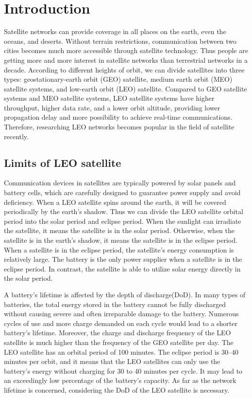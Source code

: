 \section{Introduction}
\label{ch:Introduction}
Satellite networks can provide coverage in all places on the earth, even the oceans, and deserts. Without terrain restrictions, communication between two cities becomes much more accessible through satellite technology. Thus people are getting more and more interest in satellite networks than terrestrial networks in a decade. According to different heights of orbit, we can divide satellites into three types: geostationary-earth orbit (GEO) satellite, medium earth orbit (MEO) satellite systems, and low-earth orbit (LEO) satellite. Compared to GEO satellite systems and MEO satellite systems, LEO satellite systems have higher throughput, higher data rate, and a lower orbit altitude, providing lower propagation delay and more possibility to achieve real-time communications\cite{AGENTBASED}. Therefore, researching LEO networks becomes popular in the field of satellite recently.

\subsection{Limits of LEO satellite}
Communication devices in satellites are typically powered by solar panels and battery cells, which are carefully designed to guarantee power supply and avoid deficiency\cite{CISCO}. When a LEO satellite spins around the earth, it will be covered periodically by the earth's shadow. Thus we can divide the LEO satellite orbital period into the solar period and eclipse period. When the sunlight can irradiate the satellite, it means the satellite is in the solar period. Otherwise, when the satellite is in the earth’s shadow, it means the satellite is in the eclipse period. When a satellite is in the eclipse period, the satellite’s energy consumption is relatively large. The battery is the only power supplier when a satellite is in the eclipse period. In contrast, the satellite is able to utilize solar energy directly in the solar period.

A battery's lifetime is affected by the depth of discharge(DoD). In many types of batteries, the total energy stored in the battery cannot be fully discharged without causing severe and often irreparable damage to the battery. Numerous cycles of use and more charge demanded on each cycle would lead to a shorter battery's lifetime. Moreover, the charge and discharge frequency of the LEO satellite is much higher than the frequency of the GEO satellite per day. The LEO satellite has an orbital period of 100 minutes. The eclipse period is 30–40 minutes per orbit, and it means that the LEO satellites can only use the battery's energy without charging for 30 to 40 minutes per cycle\cite{DOOR}. It may lead to an exceedingly low percentage of the battery's capacity. As far as the network lifetime is concerned, considering the DoD of the LEO satellite is necessary.

